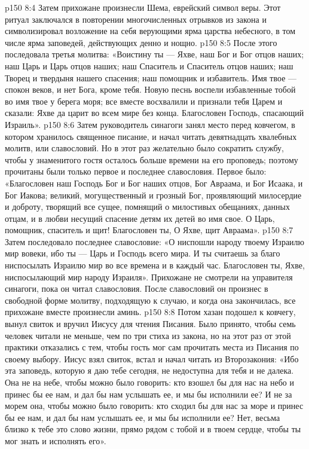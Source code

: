 \vs p150 8:4 Затем прихожане произнесли Шема, еврейский символ веры. Этот ритуал заключался в повторении многочисленных отрывков из закона и символизировал возложение на себя верующими ярма царства небесного, в том числе ярма заповедей, действующих денно и нощно.
\vs p150 8:5 После этого последовала третья молитва: «Воистину ты --- Яхве, наш Бог и Бог отцов наших; наш Царь и Царь отцов наших; наш Спаситель и Спаситель отцов наших; наш Творец и твердыня нашего спасения; наш помощник и избавитель. Имя твое --- спокон веков, и нет Бога, кроме тебя. Новую песнь воспели избавленные тобой во имя твое у берега моря; все вместе восхвалили и признали тебя Царем и сказали: Яхве да царит во всем мире без конца. Благословен Господь, спасающий Израиль».
\vs p150 8:6 Затем руководитель синагоги занял место перед ковчегом, в котором хранилось священное писание, и начал читать девятнадцать хвалебных молитв, или славословий. Но в этот раз желательно было сократить службу, чтобы у знаменитого гостя осталось больше времени на его проповедь; поэтому прочитаны были только первое и последнее славословия. Первое было: «Благословен наш Господь Бог и Бог наших отцов, Бог Авраама, и Бог Исаака, и Бог Иакова; великий, могущественный и грозный Бог, проявляющий милосердие и доброту, творящий все сущее, помнящий о милостивых обещаниях, данных отцам, и в любви несущий спасение детям их детей во имя свое. О Царь, помощник, спаситель и щит! Благословен ты, О Яхве, щит Авраама».
\vs p150 8:7 Затем последовало последнее славословие: «О ниспошли народу твоему Израилю мир вовеки, ибо ты --- Царь и Господь всего мира. И ты считаешь за благо ниспосылать Израилю мир во все времена и в каждый час. Благословен ты, Яхве, ниспосылающий мир народу Израиля». Прихожане не смотрели на управителя синагоги, пока он читал славословия. После славословий он произнес в свободной форме молитву, подходящую к случаю, и когда она закончилась, все прихожане вместе произнесли аминь.
\vs p150 8:8 Потом хазан подошел к ковчегу, вынул свиток и вручил Иисусу для чтения Писания. Было принято, чтобы семь человек читали не меньше, чем по три стиха из закона, но на этот раз от этой практики отказались с тем, чтобы гость мог сам прочитать места из Писания по своему выбору. Иисус взял свиток, встал и начал читать из Второзакония: «Ибо эта заповедь, которую я даю тебе сегодня, не недоступна для тебя и не далека. Она не на небе, чтобы можно было говорить: кто взошел бы для нас на небо и принес бы ее нам, и дал бы нам услышать ее, и мы бы исполнили ее? И не за морем она, чтобы можно было говорить: кто сходил бы для нас за море и принес бы ее нам, и дал бы нам услышать ее, и мы бы исполнили ее? Нет, весьма близко к тебе это слово жизни, прямо рядом с тобой и в твоем сердце, чтобы ты мог знать и исполнять его».
